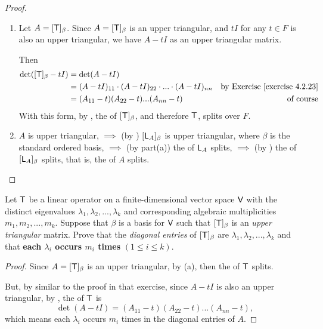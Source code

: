 \begin{proof} \ 

\begin{enumerate}
\item Let \(A = [\textsf{T}]_{\beta}\).
Since \(A = [\textsf{T}]_{\beta}\) is an upper triangular, and \(tI\) for any \(t \in F\) is also an upper triangular, we have \(A - tI\) as an upper triangular matrix.

Then
\begin{align*}
    \det([\T]_{\beta} - tI)
        & = \det(A - tI) \\
        & = (A - tI)_{11} \cdot (A - tI)_{22} \cdot ... \cdot (A - tI)_{nn} & \text{by \EXEC{4.2.23}} \\
        & = (A_{11} - t)(A_{22} - t) ... (A_{nn} - t) & \text{of course}
\end{align*}
With this form, by , the \CPOLY{} of \([\textsf{T}]_{\beta}\), and therefore \(\textsf{T}\), splits over \(F\).

\item \(A\) is upper triangular, \(\implies\) (by ) \([\textsf{L}_A]_{\beta}\) is upper triangular, where \(\beta\) is the standard ordered basis, \(\implies\) (by part(a)) the \CPOLY{} of \(\textsf{L}_A\) splits, \(\implies\) (by ) the \CPOLY{} of \([\textsf{L}_A]_{\beta}\) splits, that is, the \CPOLY{} of \(A\) splits.
\end{enumerate}
\end{proof}

\begin{exercise} \label{exercise 5.2.10}
Let \(\textsf{T}\) be a linear operator on a finite-dimensional vector space \(\textsf{V}\) with the distinct eigenvalues \(\lambda_1, \lambda_2, ..., \lambda_k\) and corresponding algebraic multiplicities \(m_1, m_2, ..., m_k\).
Suppose that \(\beta\) is a basis for \(\textsf{V}\) such that \([\textsf{T}]_{\beta}\) is an \emph{upper triangular} matrix.
Prove that the \emph{diagonal entries} of \([\textsf{T}]_{\beta}\) are \(\lambda_1, \lambda_2, ..., \lambda_k\) and that \textbf{each \(\lambda_i\) occurs \(m_i\) times} \((1 \le i \le k)\).
\end{exercise}

\begin{proof}
Since \(A = [\textsf{T}]_{\beta}\) is an upper triangular, by (a), then the \CPOLY{} of \(\textsf{T}\) splits.

But, by similar to the proof in that exercise, since \(A - tI\) is also an upper triangular, by , the \CPOLY{} of \(\textsf{T}\) is
\[
    \det(A - tI) = (A_{11} - t)(A_{22} - t) ... (A_{nn} - t),
\]
which means each \(\lambda_i\) occurs \(m_i\) times in the diagonal entries of \(A\).
\end{proof}

